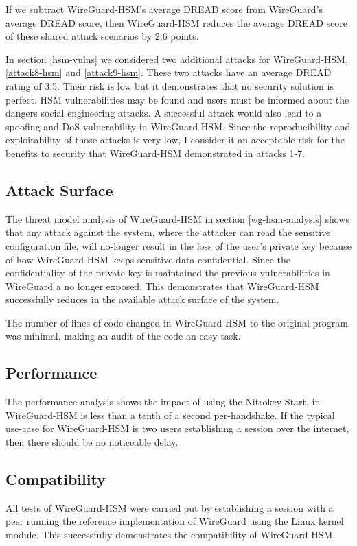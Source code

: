 \documentclass [11pt, proquest] {uwthesis}[2020/02/24]
\begin{document}
If we subtract WireGuard-HSM's average DREAD score from WireGuard's average DREAD score, then WireGuard-HSM reduces the average DREAD score of these shared attack scenarios by 2.6 points.

In section \ref{hsm-vulns} we considered two additional attacks for WireGuard-HSM, \ref{attack8-hsm} and \ref{attack9-hsm}. 
These two attacks have an average DREAD rating of 3.5. Their risk is low but it demonstrates that no security solution is perfect. HSM vulnerabilities may be found and users must be informed about the dangers social engineering attacks.
A successful attack would also lead to a spoofing and DoS vulnerability in WireGuard-HSM. Since the reproducibility and exploitability of those attacks is very low, I consider it an acceptable risk for the benefits to security that WireGuard-HSM demonstrated in attacks 1-7.


\subsection{Attack Surface}
\label{attacksurface}
The threat model analysis of WireGuard-HSM in section \ref{wg-hsm-analysis} shows that any attack against the system, where the attacker can read the sensitive configuration file, will no-longer result in the loss of the user's private key because of how WireGuard-HSM keeps sensitive data confidential. Since the confidentiality of the private-key is maintained the previous vulnerabilities in WireGuard a no longer exposed. This demonstrates that WireGuard-HSM successfully reduces in the available attack surface of the system.

The number of lines of code changed in WireGuard-HSM to the original program was minimal, making an audit of the code an easy task.

\subsection{Performance}
The performance analysis shows the impact of using the Nitrokey Start, in  WireGuard-HSM is less than a tenth of a second per-handshake. If the typical use-case for WireGuard-HSM is two users establishing a session over the internet, then there should be no noticeable delay.

\subsection{Compatibility}
All tests of WireGuard-HSM were carried out by establishing a session with a peer running the reference implementation of WireGuard using the Linux kernel module. This successfully demonstrates the compatibility of WireGuard-HSM.
\end{document}
